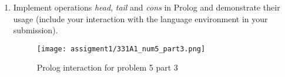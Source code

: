 \begin{enumerate}
    \item Implement operations \textit{head}, \textit{tail} and \textit{cons} in Prolog and demonstrate their usage (include your interaction with the language environment in your submission).
\\
    \begin{figure}[hbt!]
        \centering
        \texttt{[image: assigment1/331A1\_num5\_part3.png]}
        \caption{Prolog interaction for problem 5 part 3}
    \end{figure}
    
\end{enumerate}